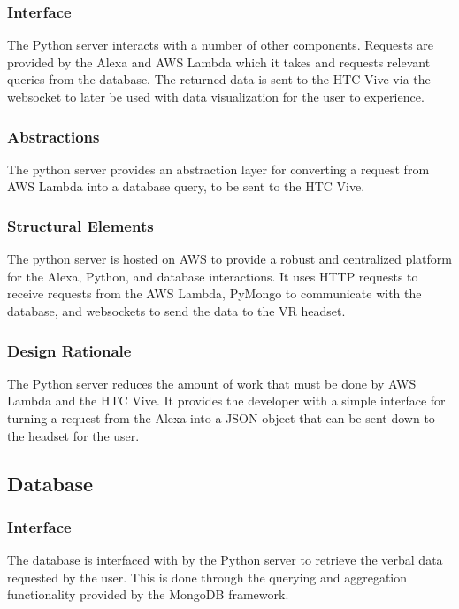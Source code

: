 \documentclass[onecolumn, draftclsnofoot,10pt, compsoc]{IEEEtran}
\begin{document}
        \subsubsection{Interface}
            The Python server interacts with a number of other components. Requests are provided by the Alexa and AWS Lambda which it takes and requests relevant queries  from the database. The returned data is sent to the HTC Vive via the websocket to later be used with data visualization for the user to experience. 
        
        \subsubsection{Abstractions}
            The python server provides an abstraction layer for converting a request from AWS Lambda into a database query, to be sent to the HTC Vive.
        
        \subsubsection{Structural Elements}
            The python server is hosted on AWS to provide a robust and centralized platform for the Alexa, Python, and database interactions. It uses HTTP requests to receive requests from the AWS Lambda, PyMongo to communicate with the database, and websockets to send the data to the VR headset.
        
        \subsubsection{Design Rationale}
            The Python server reduces the amount of work that must be done by AWS Lambda  and the HTC Vive. It provides the developer with a simple interface for turning a request from the Alexa into a JSON object that can be sent down to the headset for the user.
        
    \subsection{Database }
        \subsubsection{Interface}
            The database is interfaced with by the Python server to retrieve the verbal data requested by the user. This is done through the querying and aggregation functionality provided by the MongoDB framework.
            
\end{document}
